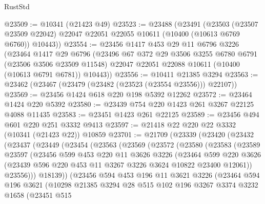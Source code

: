 \begin{lexlean}{RustStd}
\begin{coremodule}
@23509 := @10341 (@21423 @49)
@23523 := @23488
    (@23491
      (@23503
        (@23507 @23509 @22042)
        @22047
        @22051
        @22055
        @10611
        (@10400 (@10613 @6769 @6760))
        @10443))
@23554 := @23456
    @1417
    @453
    @29
    @11
    @6796
    @3226
    (@23464
      @1417
      @29
      @6796
      (@23496
        @67
        @372
        @29
        @3506
        @3255
        @6780
        @6791
        (@23506 @3506 @23509 @11548)
        @22047
        @22051
        @22088
        @10611
        (@10400 (@10613 @6791 @6781))
        @10443))
@23556 := @10411 @21385 @3294
@23563 := @23462 (@23467 (@23479 (@23482 (@23523 (@23554 @23556))) @22107))
@23569 := @23456 @1424 @618 @220 @198 @5392 @12262
@23572 := @23464 @1424 @220 @5392
@23580 := @23439 @754 @220 @1423 @261 @3267 @22125 @4088 @11435
@23583 := @23451 @1423 @261 @22125
@23589 := @23456 @494 @601 @220 @251 @3332 @9413
@23597 := @21418 @22 @220 @22 @3332 (@10341 (@21423 @22)) @10859
@23701 := @21709
    (@23339
      (@23420
        (@23432
          (@23437
            (@23449
              (@23454
                (@23563
                  (@23569
                    (@23572
                      (@23580
                        (@23583
                          (@23589
                            @23597
                            (@23456
                              @599
                              @453
                              @220
                              @11
                              @3626
                              @3226
                              (@23464
                                @599
                                @220
                                @3626
                                (@23439 @596 @220 @453 @11 @3267 @3226 @3624 @10822 @23400 @12061))
                              @23556)))
                        @18139))
                    (@23456
                      @594
                      @453
                      @196
                      @11
                      @3621
                      @3226
                      (@23464
                        @594
                        @196
                        @3621
                        (@10298
                          @21385
                          @3294
                          @28
                          @515
                          @102
                          @196
                          @3267
                          @3374
                          @3232
                          @1658
                          (@23451
                            @515

\end{coremodule}
\end{lexlean}
